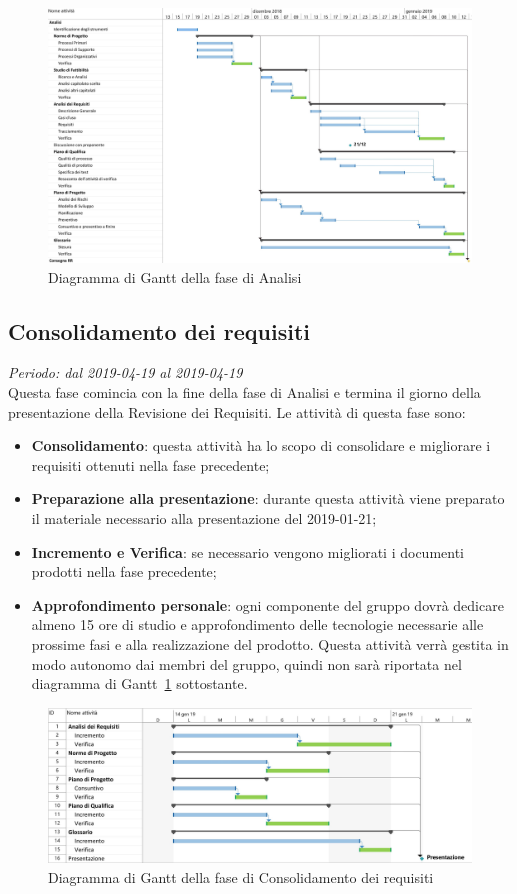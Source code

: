 \begin{figure}[H]
	\includegraphics[width=0.99\linewidth]{res/images/gantt_analisi.jpg}
	\caption{Diagramma di Gantt della fase di Analisi}
\end{figure}


\subsection{Consolidamento dei requisiti}
\textit{Periodo: dal 2019-04-19 al 2019-04-19} \\
Questa fase comincia con la fine della fase di Analisi e termina il 
giorno della presentazione della Revisione dei Requisiti. Le attività 
di questa fase sono:
\begin{itemize}
	\item \textbf{Consolidamento}: questa attività ha lo scopo di consolidare e 
	migliorare i requisiti ottenuti nella fase precedente;
	\item \textbf{Preparazione alla presentazione}: durante questa attività 
	viene preparato il materiale necessario alla presentazione del 2019-01-21;
	\item \textbf{Incremento e Verifica}: se necessario vengono migliorati i 
	documenti prodotti nella fase precedente;
	\item \textbf{Approfondimento personale}: ogni componente del gruppo dovrà 
	dedicare almeno 15 ore di studio e approfondimento delle tecnologie 
	necessarie alle prossime fasi e alla realizzazione del prodotto. Questa 
	attività verrà gestita in modo autonomo dai membri del gruppo, quindi non 
	sarà riportata nel diagramma di Gantt~\ref{fig:gantt_con} sottostante.
\end{itemize}

\begin{figure}[H]
	\includegraphics[width=0.99\linewidth]{res/images/gantt_cons.jpg}
	\caption{Diagramma di Gantt della fase di Consolidamento dei requisiti}
	\label{fig:gantt_con}
\end{figure}

